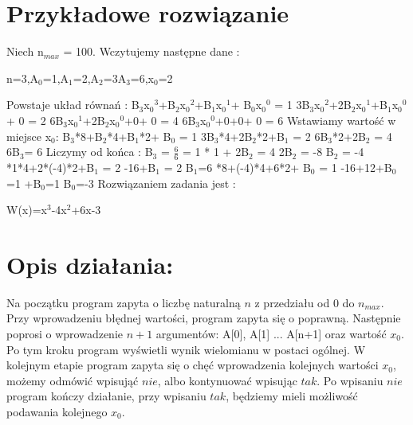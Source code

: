 \documentclass[11pt]{article}
\begin{document}
\section{Przykładowe rozwiązanie}
Niech n$_{max}$ = 100. Wczytujemy następne dane : \newline
\centerline{n=3,A$_{0}$=1,A$_{1}$=2,A$_{2}$=3A$_{3}$=6,x$_{0}$=2}
\newline \newline Powstaje układ równań : \newline 
B$_{3}$x$_{0}$$^{3}$+B$_{2}$x$_{0}$$^{2}$+B$_{1}$x$_{0}$$^{1}$+ B$_{0}$x$_{0}$$^{0}$ = 1 \newline
3B$_{3}$x$_{0}$$^{2}$+2B$_{2}$x$_{0}$$^{1}$+B$_{1}$x$_{0}$$^{0}$+ 0 = 2 \newline 
6B$_{3}$x$_{0}$$^{1}$+2B$_{2}$x$_{0}$$^{0}$+0+ 0 = 4 \newline
6B$_{3}$x$_{0}$$^{0}$+0+0+ 0 = 6 \newline \newline 
Wstawiamy wartość w miejsce x$_{0}$: \newline
B$_{3}$*8+B$_{2}$*4+B$_{1}$*2+ B$_{0}$ = 1 \newline
3B$_{3}$*4+2B$_{2}$*2+B$_{1}$ = 2 \newline 
6B$_{3}$*2+2B$_{2}$ = 4 \newline
6B$_{3}$= 6 \newline \newline 
Liczymy od końca : \newline
B$_{3}$ = $\frac {6}{6}$ = 1  * 1 + 2B$_{2}$ = 4 \newline
2B$_{2}$ = -8 \newline
B$_{2}$ = -4 *1*4+2*(-4)*2+B$_{1}$ = 2 -16+B$_{1}$ = 2 \newline
B$_{1}$=6 *8+(-4)*4+6*2+ B$_{0}$ = 1 -16+12+B$_{0}$=1 +B$_{0}$=1 \newline
B$_{0}$=-3 \newline
\newline
Rozwiązaniem zadania jest : \newline
\centerline {W(x)=x$^{3}$-4x$^{2}$+6x-3}

\clearpage

\section{Opis działania:}
Na początku program zapyta o liczbę naturalną $n$ z przedziału od 0 do $n_{max}$. Przy wprowadzeniu błędnej wartości, program zapyta się o poprawną. Następnie poprosi o wprowadzenie $n + 1$ argumentów: A[0], A[1] ... A[n+1] oraz wartość $x_0$. Po tym kroku program wyświetli wynik wielomianu w postaci ogólnej. W kolejnym etapie program zapyta się o chęć wprowadzenia kolejnych wartości $x_0$, możemy odmówić wpisująć $nie$, albo kontynuować wpisując $tak$. Po wpisaniu $nie$ program kończy działanie, przy wpisaniu $tak$, będziemy mieli możliwość podawania kolejnego $x_0$. 
\end{document}
